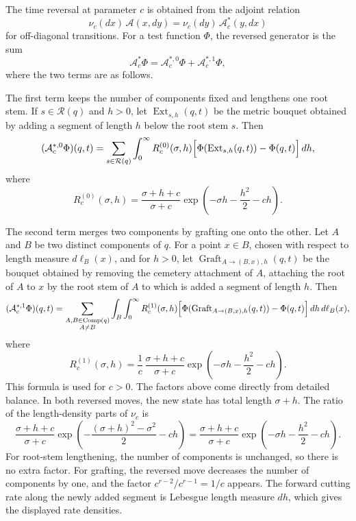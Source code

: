 \documentclass[11pt]{article}
\begin{document}
The time reversal at parameter \(c\) is obtained from the adjoint relation
\[
\nu_c(dx)\,\mathcal A(x,dy)
=
\nu_c(dy)\,\mathcal A_c^*(y,dx)
\]
for off-diagonal transitions. For a test function \(\Phi\), the
reversed generator is the sum
\[
\mathcal A_c^*\Phi
=
\mathcal A_c^{*,0}\Phi+\mathcal A_c^{*,1}\Phi ,
\]
where the two terms are as follows.

The first term keeps the number of components fixed and lengthens one root
stem. If \(s\in\mathcal R(q)\) and \(h>0\), let
\(\operatorname{Ext}_{s,h}(q,t)\) be the metric bouquet obtained by adding a
segment of length \(h\) below the root stem \(s\). Then
\[
(\mathcal A_c^{*,0}\Phi)(q,t)
=
\sum_{s\in\mathcal R(q)}
\int_0^\infty
R_c^{(0)}(\sigma,h)
\Bigl[
\Phi(\operatorname{Ext}_{s,h}(q,t))-\Phi(q,t)
\Bigr]\,dh,
\]
where
\[
R_c^{(0)}(\sigma,h)
=
\frac{\sigma+h+c}{\sigma+c}
\exp\!\left(-\sigma h-\frac{h^2}{2}-ch\right).
\]

The second term merges two components by grafting one onto the other. Let
\(A\) and \(B\) be two distinct components of \(q\). For a point
\(x\in B\), chosen with respect to length measure \(d\ell_B(x)\), and for
\(h>0\), let
\(\operatorname{Graft}_{A\to(B,x),h}(q,t)\) be the bouquet obtained by
removing the cemetery attachment of \(A\), attaching the root of \(A\) to
\(x\) by   the root stem of \(A\) to which is added a segment of length \(h\).
Then
\[
(\mathcal A_c^{*,1}\Phi)(q,t)
=
\sum_{\substack{A,B\in\operatorname{Comp}(q)\\ A\ne B}}
\int_B
\int_0^\infty
R_c^{(1)}(\sigma,h)
\Bigl[
\Phi(\operatorname{Graft}_{A\to(B,x),h}(q,t))-\Phi(q,t)
\Bigr]\,dh\,d\ell_B(x),
\]
where
\[
R_c^{(1)}(\sigma,h)
=
\frac1c\,
\frac{\sigma+h+c}{\sigma+c}
\exp\!\left(-\sigma h-\frac{h^2}{2}-ch\right).
\]
This formula is used for \(c>0\).
The factors above come directly from detailed balance. In both reversed moves,
the new state has total length \(\sigma+h\). The ratio of the length-density
parts of \(\nu_c\) is
\[
\frac{\sigma+h+c}{\sigma+c}
\exp\!\left(-\frac{(\sigma+h)^2-\sigma^2}{2}-ch\right)
=
\frac{\sigma+h+c}{\sigma+c}
\exp\!\left(-\sigma h-\frac{h^2}{2}-ch\right).
\]
For root-stem lengthening, the number of components is unchanged, so there is
no extra factor. For grafting, the reversed move decreases the number of
components by one, and the factor \(c^{r-2}/c^{r-1}=1/c\) appears. The forward
cutting rate along the newly added segment is Lebesgue length measure \(dh\),
which gives the displayed rate densities.
\end{document}
